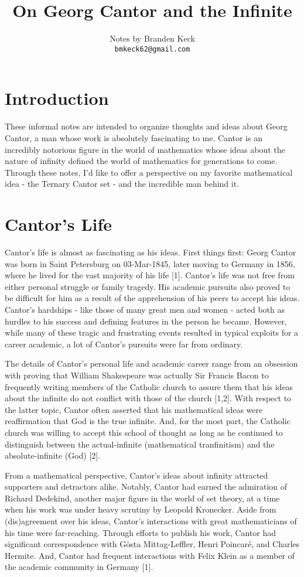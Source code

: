 \documentclass{article}
\title{
On Georg Cantor and the Infinite
}
\author{
  Notes by Branden Keck\\
  \texttt{bmkeck62@gmail.com} \\
}
\date{}
\begin{document}
\maketitle

\section{Introduction}
These informal notes are intended to organize thoughts and ideas about Georg Cantor, a man whose work is absolutely fascinating to me.  Cantor is an incredibly notorious figure in the world of mathematics whose ideas about the nature of infinity defined the world of mathematics for generations to come.  Through these notes, I'd like to offer a perspective on my favorite mathematical idea - the Ternary Cantor set - and the incredible man behind it.

\section{Cantor's Life}
Cantor's life is almost as fascinating as his ideas.  First things first:  Georg Cantor was born in Saint Petersburg on 03-Mar-1845, later moving to Germany in 1856, where he lived for the vast majority of his life [1].  Cantor's life was not free from either personal struggle or family tragedy.  His academic pursuits also proved to be difficult for him as a result of the apprehension of his peers to accept his ideas.  Cantor's hardships - like those of many great men and women - acted both as hurdles to his success and defining features in the person he became.  However, while many of these tragic and frustrating events resulted in typical exploits for a career academic, a lot of Cantor's pursuits were far from ordinary.

The details of Cantor's personal life and academic career range from an obsession with proving that William Shakespeare was actually Sir Francis Bacon to frequently writing members of the Catholic church to assure them that his ideas about the infinite do not conflict with those of the church [1,2].  With respect to the latter topic, Cantor often asserted that his mathematical ideas were reaffirmation that God is the true infinite.  And, for the most part, the Catholic church was willing to accept this school of thought as long as he continued to distinguish between the actual-infinite (mathematical tranfinitism) and the absolute-infinite (God) [2].

From a mathematical perspective, Cantor's ideas about infinity attracted supporters and detractors alike.  Notably, Cantor had earned the admiration of Richard Dedekind, another major figure in the world of set theory, at a time when his work was under heavy scrutiny by Leopold Kronecker. Aside from (dis)agreement over his ideas, Cantor's interactions with great mathematicians of his time were far-reaching.  Through efforts to publish his work, Cantor had significant correspondence with Gösta Mittag-Leffler, Henri Poincaré, and Charles Hermite.  And, Cantor had frequent interactions with Felix Klein as a member of the academic community in Germany [1].
\end{document}

